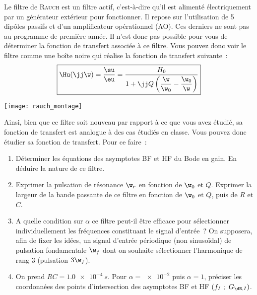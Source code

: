 \documentclass[a4paper, 11pt, final, garamond]{book}
\begin{document}
\begin{minipage}{0.45\linewidth}

    Le filtre de \textsc{Rauch} est un filtre actif, c'est-à-dire qu'il est
    alimenté électriquement par un générateur extérieur pour fonctionner. Il
    repose sur l'utilisation de 5 dipôles passifs et d'un amplificateur
    opérationnel (AO). Ces derniers ne sont pas au programme de première année.
    Il n'est donc pas possible pour vous de déterminer la fonction de transfert
    associée à ce filtre. Vous pouvez donc voir le filtre comme une boîte noire
    qui réalise la fonction de transfert suivante~: 
    \[
        \boxed{
            \Hu(\jj \w) = \frac{\su}{\eu} = \frac{H_0}{1+\jj Q
            \left(\dfrac{\w}{\w_0}-\dfrac{\w_0}{\w}\right)}
        }
    \]
\end{minipage}
\hfill
\begin{minipage}{0.45\linewidth}
    \begin{center}
        \texttt{[image: rauch\_montage]}
    \end{center}
\end{minipage}


\medskip

Ainsi, bien que ce filtre soit nouveau par rapport à ce que vous avez étudié, sa
fonction de transfert est analogue à des cas étudiés en classe. Vous pouvez donc
étudier sa fonction de transfert. Pour ce faire~: 
\begin{enumerate}[label=\sqenumi]
    \item Déterminer les équations des asymptotes BF et HF du Bode en gain. En
        déduire la nature de ce filtre.
    \item Exprimer la pulsation de résonance $\w_{r}$ en fonction de $\w_0$ et
        $Q$. Exprimer la largeur de la bande passante de ce filtre en fonction
        de $\w_0$ et $Q$, puis de $R$ et $C$.
    \item A quelle condition sur $\alpha$ ce filtre peut-il être efficace pour
        sélectionner individuellement les fréquences constituant le signal
        d'entrée~? On supposera, afin de fixer les idées, un signal d'entrée
        périodique (non sinusoïdal) de pulsation fondamentale $\w_{f}$ dont on
        souhaite sélectionner l'harmonique de rang 3 (pulsation $3\w_{f}$). 
    \item On prend $RC=\SI{1.0e-4}{s}$. Pour $\alpha= \num{e-2}$ puis $\alpha=1$,
        préciser les coordonnées des points d'intersection des asymptotes BF et
        HF $(f_{I}~;~G_{{\dB}, I})$. 
\end{enumerate}
\end{document}
